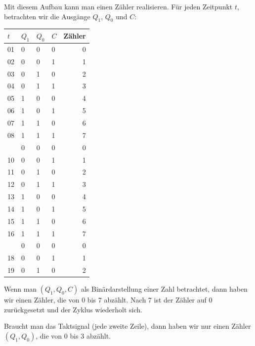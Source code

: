 \begin{enumerate}[label={[OH\arabic*]},start=15,leftmargin=0cm]
\begin{enumerate}[label={(\alph*)}]
                \newpage
                Mit diesem Aufbau kann man einen Zähler realisieren. Für jeden Zeitpunkt $t$, betrachten wir die Ausgänge $Q_1$, $Q_0$ und $C$:
                \vspace{\baselineskip}
                \begin{center}
                    \ttfamily
                    \begin{tabular}{l lll r}
                        \toprule
                        $t$ & $Q_1$ & $Q_0$ & $C$ & \textnormal{Zähler} \\
                        \midrule
                        01 & 0 & 0 & 0 & 0 \\
                        02 & 0 & 0 & 1 & 1 \\
                        03 & 0 & 1 & 0 & 2 \\
                        04 & 0 & 1 & 1 & 3 \\
                        05 & 1 & 0 & 0 & 4 \\
                        06 & 1 & 0 & 1 & 5 \\
                        07 & 1 & 1 & 0 & 6 \\
                        08 & 1 & 1 & 1 & 7 \\
                        \hdashline
                        09 & 0 & 0 & 0 & 0 \\
                        10 & 0 & 0 & 1 & 1 \\
                        11 & 0 & 1 & 0 & 2 \\
                        12 & 0 & 1 & 1 & 3 \\
                        13 & 1 & 0 & 0 & 4 \\
                        14 & 1 & 0 & 1 & 5 \\
                        15 & 1 & 1 & 0 & 6 \\
                        16 & 1 & 1 & 1 & 7 \\
                        \hdashline
                        17 & 0 & 0 & 0 & 0 \\
                        18 & 0 & 0 & 1 & 1 \\
                        19 & 0 & 1 & 0 & 2 \\
                        \bottomrule
                    \end{tabular}
                \end{center}
            \vspace{\baselineskip}
            Wenn man $(Q_1, Q_0, C)$ als Binärdarstellung einer Zahl betrachtet, dann haben wir einen Zähler, die von $0$ bis $7$ abzählt. Nach $7$ ist der Zähler auf $0$ zurückgesetzt und der Zyklus wiederholt sich. 

            Braucht man das Taktsignal (jede zweite Zeile), dann haben wir nur einen Zähler $(Q_1, Q_0)$, die von $0$ bis $3$ abzählt. 

        \end{enumerate}
\end{enumerate}